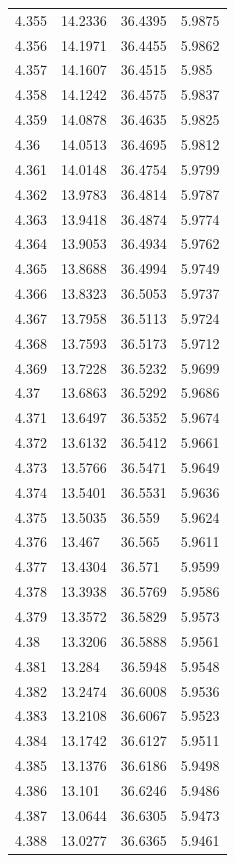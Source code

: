\begin{tabular}{llll}
4.355 & 14.2336 & 36.4395 & 5.9875 \\
4.356 & 14.1971 & 36.4455 & 5.9862 \\
4.357 & 14.1607 & 36.4515 & 5.985 \\
4.358 & 14.1242 & 36.4575 & 5.9837 \\
4.359 & 14.0878 & 36.4635 & 5.9825 \\
4.36 & 14.0513 & 36.4695 & 5.9812 \\
4.361 & 14.0148 & 36.4754 & 5.9799 \\
4.362 & 13.9783 & 36.4814 & 5.9787 \\
4.363 & 13.9418 & 36.4874 & 5.9774 \\
4.364 & 13.9053 & 36.4934 & 5.9762 \\
4.365 & 13.8688 & 36.4994 & 5.9749 \\
4.366 & 13.8323 & 36.5053 & 5.9737 \\
4.367 & 13.7958 & 36.5113 & 5.9724 \\
4.368 & 13.7593 & 36.5173 & 5.9712 \\
4.369 & 13.7228 & 36.5232 & 5.9699 \\
4.37 & 13.6863 & 36.5292 & 5.9686 \\
4.371 & 13.6497 & 36.5352 & 5.9674 \\
4.372 & 13.6132 & 36.5412 & 5.9661 \\
4.373 & 13.5766 & 36.5471 & 5.9649 \\
4.374 & 13.5401 & 36.5531 & 5.9636 \\
4.375 & 13.5035 & 36.559 & 5.9624 \\
4.376 & 13.467 & 36.565 & 5.9611 \\
4.377 & 13.4304 & 36.571 & 5.9599 \\
4.378 & 13.3938 & 36.5769 & 5.9586 \\
4.379 & 13.3572 & 36.5829 & 5.9573 \\
4.38 & 13.3206 & 36.5888 & 5.9561 \\
4.381 & 13.284 & 36.5948 & 5.9548 \\
4.382 & 13.2474 & 36.6008 & 5.9536 \\
4.383 & 13.2108 & 36.6067 & 5.9523 \\
4.384 & 13.1742 & 36.6127 & 5.9511 \\
4.385 & 13.1376 & 36.6186 & 5.9498 \\
4.386 & 13.101 & 36.6246 & 5.9486 \\
4.387 & 13.0644 & 36.6305 & 5.9473 \\
4.388 & 13.0277 & 36.6365 & 5.9461 \\

\end{tabular}
